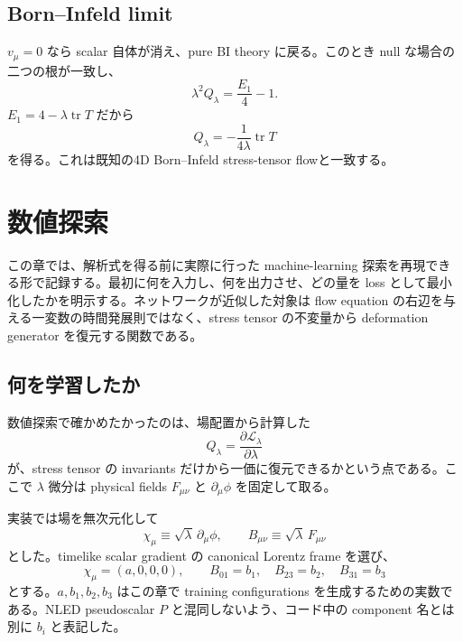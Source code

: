 \documentclass[a4paper,11pt]{ltjsreport}
\newcommand{\tr}{\operatorname{tr}}
\newcommand{\Lag}{\mathcal L}
\begin{document}
\section{Born--Infeld limit}

$v_\mu=0$ なら scalar 自体が消え、pure BI theory に戻る。このとき null な場合の二つの根が一致し、
\begin{equation}
 \lambda^2Q_\lambda=\frac{E_1}{4}-1.
\end{equation}
$E_1=4-\lambda\tr T$ だから
\begin{equation}
 Q_\lambda=-\frac{1}{4\lambda}\tr T
 \label{eq:pure-BI-flow}
\end{equation}
を得る。これは既知の4D Born--Infeld stress-tensor flow\cite{Ferko2023b,Brizio2026}と一致する。



\chapter{数値探索}

この章では、解析式を得る前に実際に行った machine-learning 探索を再現できる形で記録する。最初に何を入力し、何を出力させ、どの量を loss として最小化したかを明示する。ネットワークが近似した対象は flow equation の右辺を与える一変数の時間発展則ではなく、stress tensor の不変量から deformation generator を復元する関数である。

\section{何を学習したか}

数値探索で確かめたかったのは、場配置から計算した
\begin{equation}
 Q_\lambda=\frac{\partial\Lag_\lambda}{\partial\lambda}
\end{equation}
が、stress tensor の invariants だけから一価に復元できるかという点である。ここで $\lambda$ 微分は physical fields $F_{\mu\nu}$ と $\partial_\mu\phi$ を固定して取る。

実装では場を無次元化して
\begin{equation}
 \chi_\mu\equiv\sqrt\lambda\,\partial_\mu\phi,
 \qquad
 B_{\mu\nu}\equiv\sqrt\lambda\,F_{\mu\nu}
 \label{eq:nn-dimless-fields}
\end{equation}
とした。timelike scalar gradient の canonical Lorentz frame を選び、
\begin{equation}
 \chi_\mu=(a,0,0,0),
 \qquad
 B_{01}=b_1,\quad B_{23}=b_2,\quad B_{31}=b_3
 \label{eq:nn-canonical}
\end{equation}
とする。$a,b_1,b_2,b_3$ はこの章で training configurations を生成するための実数である。NLED pseudoscalar $P$ と混同しないよう、コード中の component 名とは別に $b_i$ と表記した。
\end{document}
